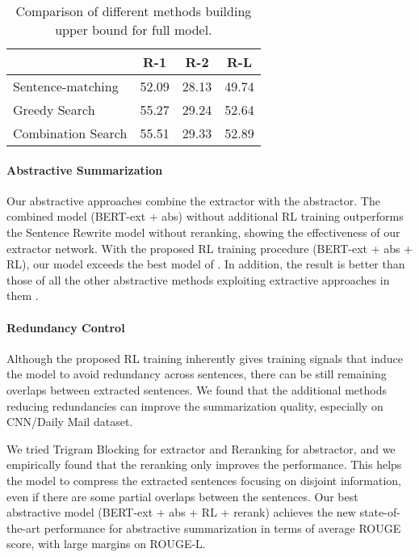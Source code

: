 \documentclass[11pt,a4paper]{article}
\begin{document}
\begin{table}
\begin{center}
\begin{adjustbox}{max width=0.8\columnwidth}
\begin{tabular}{l|ccc}
    \hline
    & \bf R-1 & \bf R-2 & \bf R-L \\
    \hline
    Sentence-matching & 52.09 & 28.13 & 49.74 \\
    Greedy Search & 55.27 & 29.24 & 52.64 \\
    Combination Search & 55.51 & 29.33 & 52.89 \\
    \hline
\end{tabular}
\end{adjustbox}
\end{center}
\caption{\label{table:oracle} Comparison of different methods building upper bound
for full model.}
\end{table}

\paragraph{Abstractive Summarization}
Our abstractive approaches combine the extractor with the abstractor.
The combined model (BERT-ext + abs) without additional RL training
outperforms the Sentence Rewrite model
\cite{chen-bansal-2018-fast} without reranking, showing the
effectiveness of our extractor network.
With the proposed RL training procedure (BERT-ext + abs + RL),
our model exceeds the best model of \citet{chen-bansal-2018-fast}.
In addition, the result is better than those of all the other abstractive methods
exploiting extractive approaches in them
\cite{hsu-etal-2018-unified, chen-bansal-2018-fast, gehrmann-etal-2018-bottom}.


\paragraph{Redundancy Control}
Although the proposed RL training inherently gives training signals
that induce the model to avoid redundancy across sentences,
there can be still remaining overlaps between extracted sentences.
We found that the additional methods reducing redundancies can
improve the summarization quality, especially on CNN/Daily Mail dataset.

We tried Trigram Blocking \cite{liu2019fine} for extractor and
Reranking \cite{chen-bansal-2018-fast} for abstractor, and we
empirically found that the reranking only improves the performance.
This helps the model to compress the extracted sentences
focusing on disjoint information, even if there are some partial
overlaps between the sentences.
Our best abstractive model (BERT-ext + abs + RL + rerank) achieves
the new state-of-the-art performance for abstractive summarization
in terms of average ROUGE score, with large margins on ROUGE-L.
\end{document}

